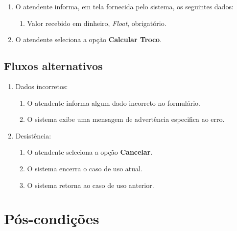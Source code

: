 \begin{enumerate}
	\item O atendente informa, em tela fornecida pelo sistema, os seguintes dados:
	\begin{enumerate}
		\item Valor recebido em dinheiro, \emph{Float}, obrigatório.		
	\end{enumerate}
	\item O atendente seleciona a opção \textbf{Calcular Troco}.
\end{enumerate}

\subsection{Fluxos alternativos}

\begin{enumerate}
	\item Dados incorretos:
	\begin{enumerate}
		\item O atendente informa algum dado incorreto no formulário. 
		\item O sistema exibe uma mensagem de advertência especifica ao erro.
	\end{enumerate}	
	\item Desistência:
	\begin{enumerate}
		\item O atendente seleciona a opção \textbf{Cancelar}.
		\item O sistema encerra o caso de uso atual.
		\item O sistema retorna ao caso de uso anterior.
	\end{enumerate}
\end{enumerate}



\section{Pós-condições}



